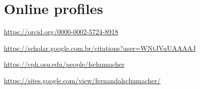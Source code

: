\documentclass[
  10pt,
  letterpaper,
]{article}
\providecommand{\tightlist}{%
  \setlength{\itemsep}{0pt}\setlength{\parskip}{0pt}}
\begin{document}
\section{Online profiles}\label{online-profiles}

\begin{description}
\tightlist
\item[ORCID]
\url{https://orcid.org/0000-0002-5724-8918}
\item[Google Scholar]
\url{https://scholar.google.com.br/citations?user=WNtJVuUAAAAJ}
\item[OSU profile]
\url{https://cph.osu.edu/people/fschumacher}
\item[Personal page]
\url{https://sites.google.com/view/fernandalschumacher/}
\end{description}
\end{document}
